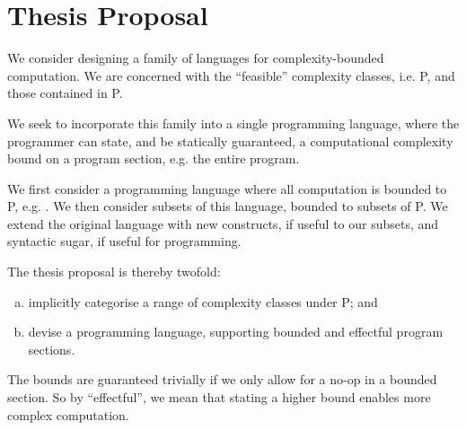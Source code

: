 
\section{Thesis Proposal}

We consider designing a family of languages for complexity-bounded computation.
We are concerned with the ``feasible'' complexity classes, i.e. P, and those
contained in P.

We seek to incorporate this family into a single programming language, where
the programmer can state, and be statically guaranteed, a computational
complexity bound on a program section, e.g. the entire program.

We first consider a programming language where all computation is bounded to P,
e.g. \cite{bellantoni-cook-1992,jones-1999}.  We then consider subsets of this
language, bounded to subsets of P. We extend the original language with new
constructs, if useful to our subsets, and syntactic sugar, if useful for
programming.

The thesis proposal is thereby twofold:

\begin{enumerate}[(a)]

\item implicitly categorise a range of complexity classes under P; and

\item devise a programming language, supporting bounded and effectful program
sections.

\end{enumerate}

The bounds are guaranteed trivially if we only allow for a no-op in a bounded
section. So by ``effectful'', we mean that stating a higher bound enables more
complex computation.
